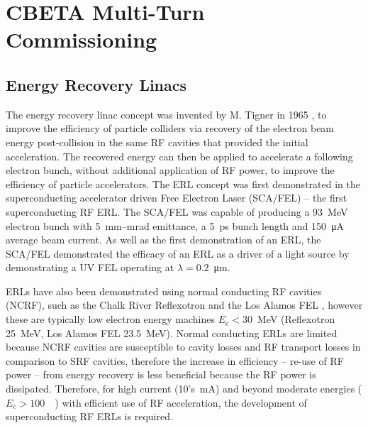 \documentclass[../main.tex]{subfiles}
\begin{document}
\chapter{CBETA Multi-Turn Commissioning}
\label{CBETA_Multi-Pass_Commissioning} %

\section{Energy Recovery Linacs}

The energy recovery linac concept was invented by M. Tigner in 1965 \cite{tigner1965possible}, to improve the efficiency of particle colliders via recovery of the electron beam energy post-collision in the same RF cavities that provided the initial acceleration. The recovered energy can then be applied to accelerate a following electron bunch, without additional application of RF power, to improve the efficiency of particle accelerators. The ERL concept was first demonstrated in the superconducting accelerator driven Free Electron Laser (SCA/FEL) \cite{smith1987development} -- the first superconducting RF ERL. The SCA/FEL was capable of producing a 93~\si{\mega\electronvolt} electron bunch with 5~\si{\milli\meter}--\si{\milli\radian} emittance, a 5~\si{\pico\second} bunch length and 150~\si{\micro\ampere} average beam current. As well as the first demonstration of an ERL, the SCA/FEL demonstrated the efficacy of an ERL as a driver of a light source by demonstrating a UV FEL operating at $\lambda = 0.2$~\si{\micro\meter}.

ERLs have also been demonstrated using normal conducting RF cavities (NCRF), such as the Chalk River Reflexotron \cite{schriber1977experimental} and the Los Alamos FEL \cite{feldman1987energy}, however these are typically low electron energy machines $E_{e} < 30$~\si{\mega\electronvolt} (Reflexotron 25~\si{\mega\electronvolt}, Los Alamos FEL 23.5~\si{\mega\electronvolt}). Normal conducting ERLs are limited because NCRF cavities are susceptible to cavity losses and RF transport losses \cite{adolphsen2022european} in comparison to SRF cavities, therefore the increase in efficiency -- re-use of RF power -- from energy recovery is less beneficial because the RF power is dissipated. Therefore, for high current (10's~\si{\milli\ampere}) and beyond moderate energies ($E_{e} > 100$~\si{\mega\electron}) with efficient use of RF acceleration, the development of superconducting RF ERLs is required.
\end{document}
